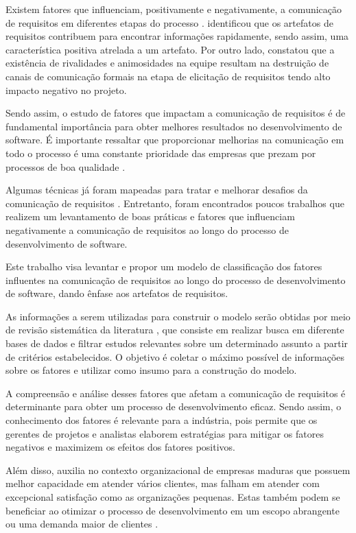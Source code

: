 Existem fatores que influenciam, positivamente e negativamente, a comunicação de requisitos em diferentes etapas do processo \cite{coughlan, liskin2015artifacts}.  identificou que os artefatos de requisitos contribuem para encontrar informações rapidamente, sendo assim, uma característica positiva atrelada a um artefato. Por outro lado,  constatou que a existência de rivalidades e animosidades na equipe resultam na destruição de canais de comunicação formais na etapa de elicitação de requisitos tendo alto impacto negativo no projeto.

Sendo assim, o estudo de fatores que impactam a comunicação de requisitos é de fundamental importância para obter melhores resultados no desenvolvimento de software. É importante ressaltar que proporcionar melhorias na comunicação em todo o processo é uma constante prioridade das empresas que prezam por processos de boa qualidade \cite{sommerville}.

Algumas técnicas já foram mapeadas para tratar e melhorar desafios da comunicação de requisitos \cite{jdavis, Stapel}. Entretanto, foram encontrados poucos trabalhos que realizem um levantamento de boas práticas e fatores que influenciam negativamente a comunicação de requisitos ao longo do processo de desenvolvimento de software.

Este trabalho visa levantar e propor um modelo de classificação dos fatores influentes na comunicação de requisitos ao longo do processo de desenvolvimento de software, dando ênfase aos artefatos de requisitos. 

As informações a serem utilizadas para construir o modelo serão obtidas por meio de revisão sistemática da literatura \cite{kitchenham}, que consiste em realizar busca em diferente bases de dados e filtrar estudos relevantes sobre um determinado assunto a partir de critérios estabelecidos. O objetivo é coletar o máximo possível de informações sobre os fatores e utilizar como insumo para a construção do modelo.

A compreensão e análise desses fatores que afetam a comunicação de requisitos é determinante para obter um processo de desenvolvimento eficaz. Sendo assim, o conhecimento dos fatores é relevante para a indústria, pois permite que os gerentes de projetos e analistas elaborem estratégias para mitigar os fatores negativos e maximizem os efeitos dos fatores positivos. 

Além disso, auxilia no contexto organizacional de empresas maduras que possuem melhor capacidade em atender vários clientes, mas falham em atender com excepcional satisfação como as organizações pequenas. Estas também podem se beneficiar ao otimizar o processo de desenvolvimento em um escopo abrangente ou uma demanda maior de clientes \cite{laukkanen2018comparison}.

